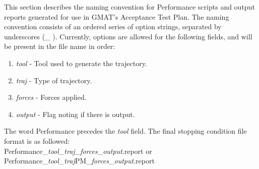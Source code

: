 This section describes the naming convention for Performance scripts
and output reports generated for use in GMAT's Acceptance Test Plan.
The naming convention consists of an ordered series of option
strings, separated by underscores (\_ ). Currently, options are
allowed for the following fields, and will be present in the file
name in order:
\begin{enumerate}
  \item \emph{tool} - Tool used to generate the trajectory.
  \item \emph{traj} - Type of trajectory.
  \item \emph{forces} - Forces applied.
  \item \emph{output} - Flag noting if there is output.
\end{enumerate}

The word Performance precedes the \emph{tool} field. The final
stopping condition file format is as followed:\\
Performance\_\emph{tool}\_\emph{traj}\_\emph{forces}\_\emph{output}.report or\\
Performance\_\emph{tool}\_\emph{traj}PM\_\emph{forces}\_\emph{output}.report

